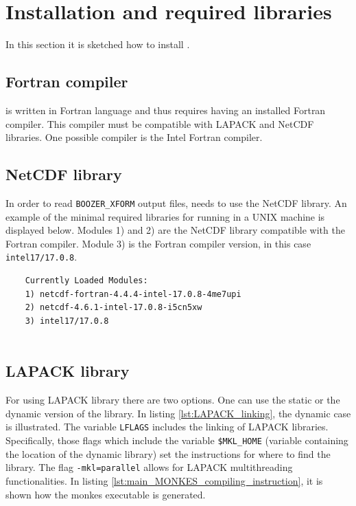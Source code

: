 \section{Installation and required libraries}
In this section it is sketched how to install {\MONKES}. 
\subsection{Fortran compiler}
{\MONKES} is written in Fortran language and thus requires having an installed Fortran compiler. This compiler must be compatible with LAPACK and NetCDF libraries. One possible compiler is the Intel Fortran compiler.

\subsection{NetCDF library}

In order to read \texttt{BOOZER\_XFORM} output files, {\MONKES} needs to use the NetCDF library. An example of the minimal required libraries for running {\MONKES} in a UNIX machine is displayed below. Modules 1) and 2) are the NetCDF library compatible with the Fortran compiler. Module 3) is the Fortran compiler version, in this case \texttt{intel17/17.0.8}.
\begin{verbatim}
	Currently Loaded Modules:
	1) netcdf-fortran-4.4.4-intel-17.0.8-4me7upi   
	2) netcdf-4.6.1-intel-17.0.8-i5cn5xw   
	3) intel17/17.0.8
	
\end{verbatim} 

\subsection{LAPACK library}
For using LAPACK library there are two options. One can use the static or the dynamic version of the library. In listing \ref{lst:LAPACK_linking}, the dynamic case is illustrated.
 The variable \texttt{LFLAGS} includes the linking of LAPACK libraries. Specifically, those flags which include the variable \texttt{\$MKL\_HOME} (variable containing the location of the dynamic library) set the instructions for where to find the library. The flag \texttt{-mkl=parallel} allows for LAPACK multithreading functionalities. In listing \ref{lst:main_MONKES_compiling_instruction}, it is shown how the monkes executable is generated. 
 
 \begingroup
 \endgroup